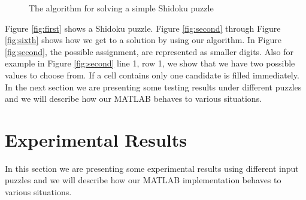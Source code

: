\documentclass[12pt,a4paper]{article} %
\begin{document}
\begin{figure}[ht!]
\begin{center}
%
\end{center}
\caption{%
The algorithm for solving a simple Shidoku puzzle 
}%
\end{figure}
Figure \ref{fig:first} shows a Shidoku puzzle. Figure \ref{fig:second} through Figure \ref{fig:sixth} shows how we get to a solution by using our algorithm. In Figure \ref{fig:second}, the possible assignment, are represented as smaller digits. Also for example in Figure \ref{fig:second} line 1, row 1, we show that we have two possible values to choose from. If a cell contains only one candidate is filled immediately.
\newline
\\ In the next section we are presenting some testing results under different puzzles and we will describe how our MATLAB behaves to various situations.
\section{Experimental Results}
In this section we are presenting some experimental results using different input puzzles and we will describe how our MATLAB implementation behaves to various situations.
\end{document}
